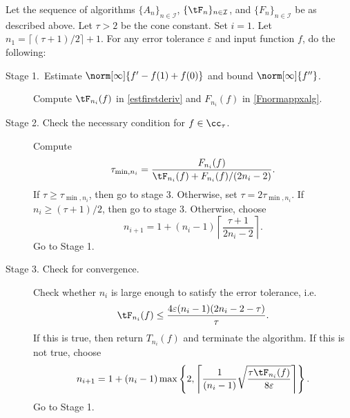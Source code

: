 \begin{algo} \label{multistageapproalgo}
Let the sequence of algorithms $\{A_n\}_{n\in \mathcal{I}}$, $\{\tF_n\}_{n\in \mathcal{I}}$, and $\{F_n\}_{n\in \mathcal{I}}$ be as described above. 
Let $\tau>2$ be the cone constant. Set $i=1$. Let $n_1=\lceil(\tau+1)/2\rceil+1$. For any error tolerance $\varepsilon$ and input function $f$, do the following:
\begin{description}
\item[Stage 1.\ Estimate {$\norm[\infty]{f'-f(1)+f(0)}$} and bound {$\norm[\infty]{f''}$}.] Compute $\tF_{n_i}(f)$ in \eqref{estfirstderiv} and $F_{n_i}(f)$ in \eqref{Fnormappxalg}.

\item[Stage 2. Check the necessary condition for $f \in \cc_{\tau}$.] Compute 
    \begin{align*}
     \tau_{\min,n_i} =  \frac{F_{n_i}(f)}{\tF_{n_i}(f)+F_{n_i}(f)/(2n_i-2)}.
    \end{align*}
If $\tau \ge \tau_{\min,n_i}$, then go to stage 3.  Otherwise, set $\tau = 2\tau_{\min,n_i}$.  If $n_i \ge (\tau+1)/2$, then go to stage 3.  Otherwise, choose 
$$
n_{i+1}=1+ (n_i-1)\left\lceil\frac{\tau+1}{2n_i-2}\right\rceil.
$$
Go to Stage 1.

\item[Stage 3. Check for convergence.] Check whether $n_i$ is large enough to satisfy the error tolerance, i.e.
    \begin{equation*}
     \tF_{n_i}(f) \le \frac{4\varepsilon(n_i-1)(2n_i-2 - \tau)}{\tau}.
    \end{equation*}
If this is true, then return $T_{n_i}(f)$ and terminate the algorithm.   If this is not true, choose
$$
n_{i+1}=1+ (n_i-1)\max\left\{2,\left\lceil\frac{1}{(n_i-1)}\sqrt{\frac{\tau \tF_{n_i}(f)}{8\varepsilon}}\right\rceil\right\}.
$$
Go to Stage 1.
\end{description}
\end{algo}


